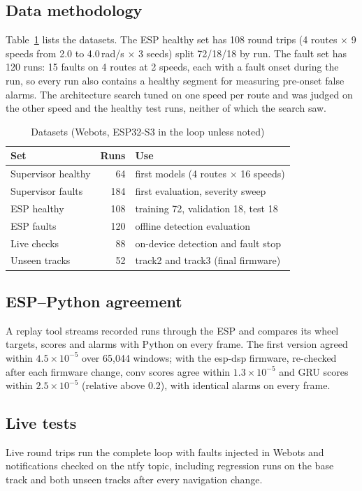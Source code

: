 \documentclass[conference]{IEEEtran}
\begin{document}
\subsection{Data methodology}
Table~\ref{tab:data} lists the datasets. The ESP healthy set has 108 round trips
(4 routes $\times$ 9 speeds from 2.0 to 4.0\,rad/s $\times$ 3 seeds) split
72/18/18 by run. The fault set has 120 runs: 15 faults on 4 routes at 2 speeds,
each with a fault onset during the run, so every run also contains a healthy
segment for measuring pre-onset false alarms. The architecture search tuned on
one speed per route and was judged on the other speed and the healthy test
runs, neither of which the search saw.

\begin{table}[t]
\caption{Datasets (Webots, ESP32-S3 in the loop unless noted)}
\label{tab:data}
\centering
\footnotesize
\begin{tabular}{@{}p{2.45cm}rp{4.0cm}@{}}
\toprule
Set & Runs & Use \\
\midrule
Supervisor healthy & 64 & first models (4 routes $\times$ 16 speeds) \\
Supervisor faults & 184 & first evaluation, severity sweep \\
ESP healthy & 108 & training 72, validation 18, test 18 \\
ESP faults & 120 & offline detection evaluation \\
Live checks & 88 & on-device detection and fault stop \\
Unseen tracks & 52 & track2 and track3 (final firmware) \\
\bottomrule
\end{tabular}
\end{table}

\subsection{ESP--Python agreement}
A replay tool streams recorded runs through the ESP and compares its wheel
targets, scores and alarms with Python on every frame. The first version agreed
within $4.5\times10^{-5}$ over 65{,}044 windows; with the esp-dsp firmware,
re-checked after each firmware change, conv scores agree within
$1.3\times10^{-5}$ and GRU scores within $2.5\times10^{-5}$ (relative above 0.2),
with identical alarms on every frame.

\subsection{Live tests}
Live round trips run the complete loop with faults injected in Webots and
notifications checked on the ntfy topic, including regression runs on the base
track and both unseen tracks after every navigation change.
\end{document}
